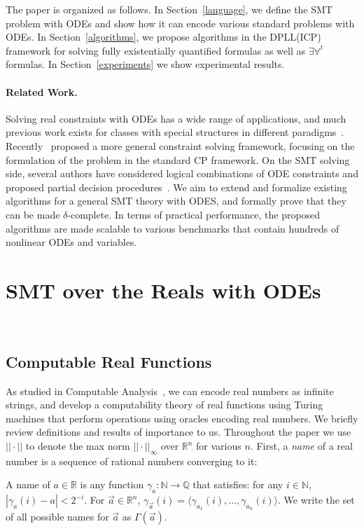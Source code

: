 \documentclass[11pt]{article}
\begin{document}
The paper is organized as follows. In Section~\ref{language}, we define the SMT problem with ODEs and show how it can encode various standard problems with ODEs. In Section~\ref{algorithms}, we propose algorithms in the DPLL(ICP) framework for solving fully existentially quantified formulas as well as $\exists\forall^t$ formulas. In Section~\ref{experiments} we show experimental results.

\paragraph{Related Work.} 
Solving real constraints with ODEs has a wide range of applications, and much previous work exists for classes with special structures in different paradigms~\cite{DBLP:conf/cp/CruzB03,Granvilliers:2005:PEU:1039891.1039931,Lin07guaranteedstate}. Recently~\cite{DBLP:conf/cp/GoldsztejnMEH10} proposed a more general constraint solving framework, focusing on the formulation of the problem in the standard CP framework. On the SMT solving side, several authors have considered logical combinations of ODE constraints and proposed partial decision procedures~\cite{Eggers2008,Eggers2011,DBLP:journals/sttt/IshiiUH11}. We aim to extend and formalize existing algorithms for a general SMT theory with ODES, and formally prove that they can be made $\delta$-complete. In terms of practical performance, the proposed algorithms are made scalable to various benchmarks that contain hundreds of nonlinear ODEs and variables. 

\section{SMT over the Reals with ODEs}~\label{language}
\vspace{-0.8cm}
\subsection{Computable Real Functions}
As studied in Computable Analysis~\cite{CAbook,Kobook}, we can encode real numbers as infinite strings, and develop a computability theory of real functions using Turing machines that perform operations using oracles encoding real numbers.  We briefly review definitions and results of importance to us. Throughout the paper we use $||\cdot||$ to denote the max norm $||\cdot||_{\infty}$ over $\mathbb{R}^n$ for various $n$. First, a {\em name} of a real number is a sequence of rational numbers converging to it:
\begin{definition}[Names]
A name of $a\in \mathbb{R}$ is any function $\mathcal{\gamma}_a: \mathbb{N}\rightarrow \mathbb{Q}$ that satisfies:  for any $i\in \mathbb{N}$, $|\gamma_a(i) - a|<2^{-i}$. For $\vec a\in \mathbb{R}^n$, $\gamma_{\vec a}(i) = \langle \gamma_{a_1}(i), ..., \gamma_{a_n}(i)\rangle$. We write the set of all possible names for $\vec a$ as $\Gamma(\vec a)$.
\end{definition}
\end{document}

